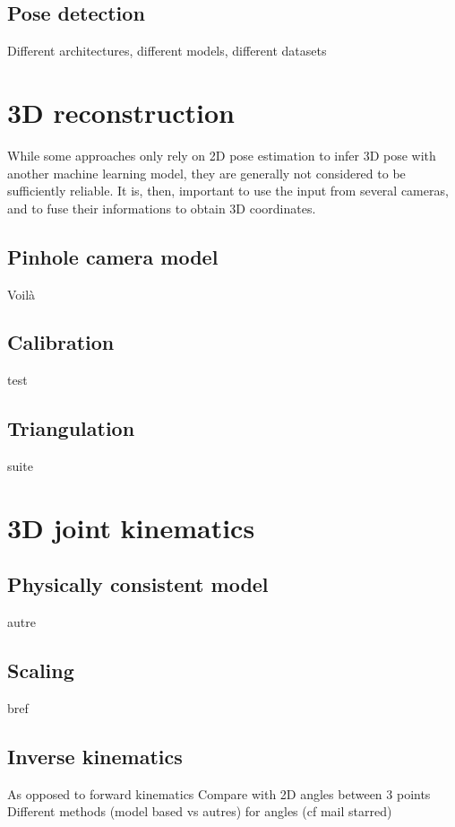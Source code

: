 \subsection{Pose detection}

Different architectures, different models, different datasets


\section{3D reconstruction}\label{sec:3D reconstruction}

While some approaches only rely on 2D pose estimation to infer 3D pose with another machine learning model, they are generally not considered to be sufficiently reliable. It is, then, important to use the input from several cameras, and to fuse their informations to obtain 3D coordinates.


\subsection{Pinhole camera model}

Voilà


\subsection{Calibration}

test


\subsection{Triangulation}

suite


\section{3D joint kinematics}

\subsection{Physically consistent model}

autre


\subsection{Scaling}

bref


\subsection{Inverse kinematics}

As opposed to forward kinematics \newline
Compare with 2D angles between 3 points \newline
Different methods (model based vs autres) for angles (cf mail starred)\newline




